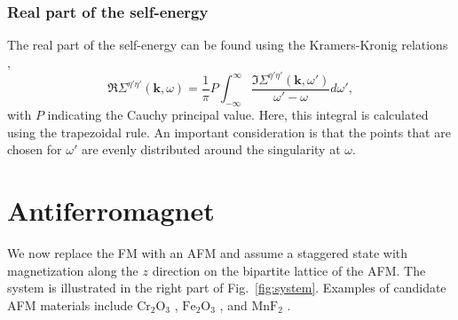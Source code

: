 \documentclass[aps, prb, twocolumn,amsmath,amssymb,floatfix]{revtex4-2}
\begin{document}
\subsubsection{Real part of the self-energy}
The real part of the self-energy can be found using the Kramers-Kronig relations \cite{Kramers-Kronig},
\begin{equation}
\label{eq:resigma}
    \Re\Sigma^{\eta'\eta'}(\boldsymbol{k}, \omega) = \frac{1}{\pi}P\int_{-\infty}^{\infty}\frac{\Im\Sigma^{\eta'\eta'}(\boldsymbol{k}, \omega')}{\omega'-\omega}d\omega',
\end{equation}
with $P$ indicating the Cauchy principal value.
Here, this integral is calculated using the trapezoidal rule. An important consideration is that the points that are chosen for $\omega'$ are evenly distributed around the singularity at $\omega$. 











\section{Antiferromagnet} \label{sec:AFM}

We now replace the FM with an AFM and assume a staggered state with magnetization along the $z$ direction on the bipartite lattice of the AFM. The system is illustrated in the right part of Fig.~\ref{fig:system}. Examples of candidate AFM materials include $\textrm{Cr}_2\textrm{O}_3$ \cite{ExpAFMCr2O3}, $\textrm{Fe}_2\textrm{O}_3$ \cite{ExpAFMFe2O3}, and $\textrm{MnF}_2$ \cite{ExpAFMMnF2, AFMNMAFMArnePRB}.   
\end{document}
